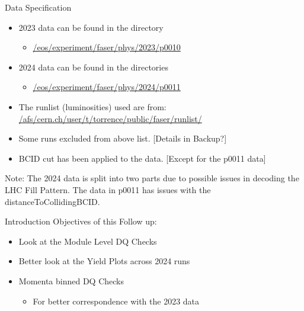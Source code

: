 \begin{frame}{Data Specification}
    \begin{itemize}
        \item 2023 data can be found in the directory
        \begin{itemize}
            \item \href{/eos/experiment/faser/phys/2023/p0010}{/eos/experiment/faser/phys/2023/p0010}
        \end{itemize}
        \item 2024 data can be found in the directories
        \begin{itemize}
            \item \href{/eos/experiment/faser/phys/2024/p0011, p0012}{/eos/experiment/faser/phys/2024/p0011}
        \end{itemize}
        \item The runlist (luminosities) used are from:
        \href{/afs/cern.ch/user/t/torrence/public/faser/runlist/2024/faser runlist 2024 stable.csv}{/afs/cern.ch/user/t/torrence/public/faser/runlist/}
        \item Some runs excluded from above list. [Details in Backup?]
        \item BCID cut has been applied to the data. [Except for the p0011 data]
    \end{itemize}
    
    Note: The 2024 data is split into two parts due to possible issues in decoding the LHC Fill Pattern. The data in p0011 has issues with the distanceToCollidingBCID.
\end{frame}

\begin{frame}{Introduction}
    Objectives of this Follow up:
    \begin{itemize}
        \item Look at the Module Level DQ Checks
        \item Better look at the Yield Plots across 2024 runs
        \item Momenta binned DQ Checks 
        \begin{itemize}
            \item For better correspondence with the 2023 data
        \end{itemize}
    \end{itemize}
\end{frame}